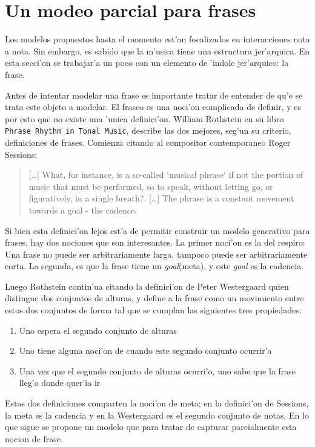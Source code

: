 \section{Un modeo parcial para frases}
\label{sec:phrases}
Los modelos propuestos hasta el momento est'an focalizados en interacciones nota a nota. Sin embargo, es sabido que la m'usica
tiene una estructura jer'arquica. En esta secci'on se trabajar'a un poco con un elemento de 'indole jer'arquico: la frase. 

Antes de intentar modelar una frase es importante tratar de entender de qu'e se trata este objeto a modelar. El fraseo es una
noci'on complicada de definir, y es por esto que no existe una 'unica definici'on. William Rothstein en su libro \texttt{Phrase Rhythm 
in Tonal Music}, describe las dos mejores, seg'un su criterio, definiciones de frases. Comienza citando al compositor contemporaneo
Roger Sessions: 

\begin{quote} 
[\ldots] What, for instance, is a so-called `musical phrase` if not the portion of music that must be performed, so to speak, 
without letting go, or figuratively, in a single breath?. [\ldots] The phrase is a constant movement towards a goal - the cadence.
\end{quote}

Si bien esta definici'on lejos est'a de permitir construir un modelo generativo para frases, hay dos nociones que son interesantes. 
La primer noci'on es la del respiro: Una frase no puede ser arbitrariamente larga, tampoco puede ser arbitrariamente corta. La 
segunda, es que la frase tiene un \emph{goal}(meta), y este \emph{goal} es la cadencia.%

Luego Rothstein contin'ua citando la definici'on de Peter Westergaard quien distingue dos conjuntos de alturas, y define
a la frase como un movimiento entre estos dos conjuntos de forma tal que se cumplan las siguientes tres propiedades:
\begin{enumerate}
 \item Uno espera el segundo conjunto de alturas
 \item Uno tiene alguna noci'on de cuando este segundo conjunto ocurrir'a
 \item Una vez que el segundo conjunto de alturas ocurri'o, uno sabe que la frase lleg'o donde quer'ia ir
\end{enumerate}


Estas dos definiciones comparten la noci'on de meta; en la definici'on de Sessions, la meta es la cadencia y en la Westergaard 
es el segundo conjunto de notas.  En lo que sigue se propone un modelo que para tratar de capturar parcialmente esta nocion de frase.

